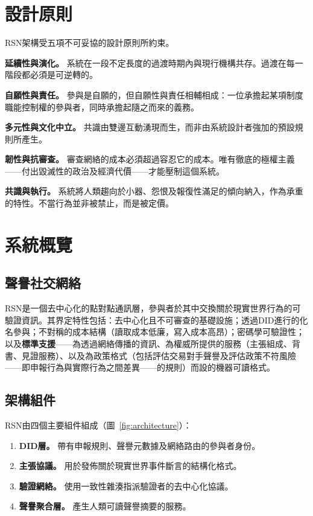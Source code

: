 \documentclass[11pt,a4paper,twocolumn]{article}
\begin{document}
\section{設計原則}

RSN架構受五項不可妥協的設計原則所約束。

\textbf{延續性與演化。} 系統在一段不定長度的過渡時期內與現行機構共存。過渡在每一階段都必須是可逆轉的。

\textbf{自願性與責任。} 參與是自願的，但自願性與責任相輔相成：一位承擔起某項制度職能控制權的參與者，同時承擔起隨之而來的義務。

\textbf{多元性與文化中立。} 共識由雙邊互動湧現而生，而非由系統設計者強加的預設規則所產生。

\textbf{韌性與抗審查。} 審查網絡的成本必須超過容忍它的成本。唯有徹底的極權主義——付出毀滅性的政治及經濟代價——才能壓制這個系統。

\textbf{共識與執行。} 系統將人類趨向於小器、怨恨及報復性滿足的傾向納入，作為承重的特性。不當行為並非被禁止，而是被定價。

\section{系統概覽}

\subsection{聲譽社交網絡}

RSN是一個去中心化的點對點通訊層，參與者於其中交換關於現實世界行為的可驗證資訊。其界定特性包括：去中心化且不可審查的基礎設施；透過DID進行的化名參與；不對稱的成本結構（讀取成本低廉，寫入成本高昂）；密碼學可驗證性；以及\textbf{標準支援}——為透過網絡傳播的資訊、為權威所提供的服務（主張組成、背書、見證服務）、以及為政策格式（包括評估交易對手聲譽及評估政策不符風險——即申報行為與實際行為之間差異——的規則）而設的機器可讀格式。

\subsection{架構組件}

RSN由四個主要組件組成（圖~\ref{fig:architecture}）：
\begin{enumerate}[nosep]
\item \textbf{DID層。} 帶有申報規則、聲譽元數據及網絡路由的參與者身份。
\item \textbf{主張協議。} 用於發佈關於現實世界事件斷言的結構化格式。
\item \textbf{驗證網絡。} 使用一致性雜湊指派驗證者的去中心化協議。
\item \textbf{聲譽聚合層。} 產生人類可讀聲譽摘要的服務。
\end{enumerate}
\end{document}
